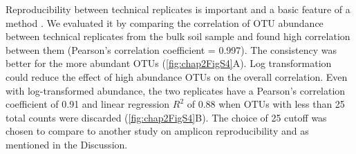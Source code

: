 \documentclass[]{msu-thesis}
\begin{document}
Reproducibility between technical replicates is important and a basic feature of a method \cite{zhou_reproducibility_2011,zhou_high-throughput_2015}. We evaluated it by comparing the correlation of OTU abundance between technical replicates from the bulk soil sample and found high correlation between them (Pearson’s correlation coefficient = 0.997). The consistency was better for the more abundant OTUs (\cref{fig:chap2FigS4}A). Log transformation could reduce the effect of high abundance OTUs on the overall correlation. Even with log-transformed abundance, the two replicates have a Pearson’s correlation coefficient of 0.91 and linear regression $R^2$ of 0.88 when OTUs with less than 25 total counts were discarded (\cref{fig:chap2FigS4}B). The choice of 25 cutoff was chosen to compare to another study on amplicon reproducibility \cite{lundberg_defining_2012} and as mentioned in the Discussion. 

\end{document}
